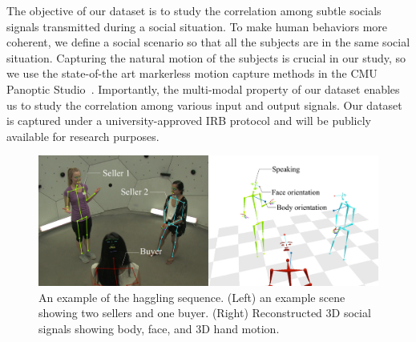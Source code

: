 The objective of our dataset is to study the correlation among subtle socials signals transmitted during a social situation. To make human behaviors more coherent, we define a social scenario so that all the subjects are in the same social situation. Capturing the natural motion of the subjects is crucial in our study, so we use the state-of-the art markerless motion capture methods in the CMU Panoptic Studio~\cite{joo2017panoptic, joo2018}. Importantly, the multi-modal property of our dataset enables us to study the correlation among various input and output signals. Our dataset is captured under a university-approved IRB protocol and will be publicly available for research purposes.
\begin{figure}
	\centering
	\includegraphics[width=\linewidth]{ssp_fig/haggling_ex}
	\caption{An example of the haggling sequence. (Left) an example scene showing two sellers and one buyer. (Right) Reconstructed 3D social signals showing body, face, and 3D hand motion.} 
	\label{fig:hagglign_ex}
\end{figure}


